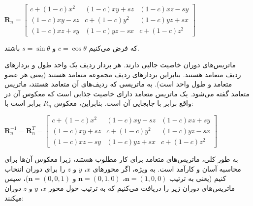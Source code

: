 {\begin{spacing}{1.5}
        \begin{center}
            $\textbf{R}_{n}=\begin{bmatrix}
                                c+(1-c)x^{2} & (1-c)xy+sz   & (1-c)xz-sy \\
                                (1-c)xy-sz   & c+(1-c)y^{2} & (1-c)yz+sx \\
                                (1-c)xz+sy   & (1-c)yz-sx   & c+(1-c)z^{2}
            \end{bmatrix}$
        \end{center}

        که فرض می‌کنیم $c=\cos\theta$ و $s=\sin\theta$ باشند.

        ماتریس‌های دوران خاصیت جالبی دارند. هر بردار ردیف یک واحد طول و بردارهای ردیف متعامد هستند.
        بنابراین بردارهای ردیف مجموعه متعامد هستند (یعنی هر عضو متعامد و طول واحد است).
        به ماتریسی که ردیف‌های آن متعامد هستند، ماتریس متعامد گفته می‌شود.
        یک ماتریس متعامد دارای خاصیت جذابی است که معکوس آن در واقع برابر با جابجایی آن است. بنابراین، معکوس $R_{n}$ برابر است با:

        \begin{center}
            $\textbf{R}^{-1}_{n}=\textbf{R}^{T}_{n}=\begin{bmatrix}
                                                        c+(1-c)x^{2} & (1-c)xy-sz   & (1-c)xz+sy \\
                                                        (1-c)xy+sz   & c+(1-c)y^{2} & (1-c)yz-sx \\
                                                        (1-c)xz-sy   & (1-c)yz+sx   & c+(1-c)z^{2}
            \end{bmatrix}$
        \end{center}

        به طور کلی، ماتریس‌های متعامد برای کار مطلوب هستند، زیرا معکوس آن‌ها برای محاسبه آسان و کارآمد است.
        به ویژه، اگر محورهای $x$، $y$ و $z$ را برای دوران انتخاب کنیم (یعنی به ترتیب $\textbf{n}=(1,0,0)$، $\textbf{n}=(0,1,0)$ و $\textbf{n}=(0,0,1)$)،
        سپس ماتریس‌های دوران زیر را دریافت می‌کنیم که به ترتیب حول محور $x$، $y$ و $z$ دوران میکنند:


\end{spacing}}

